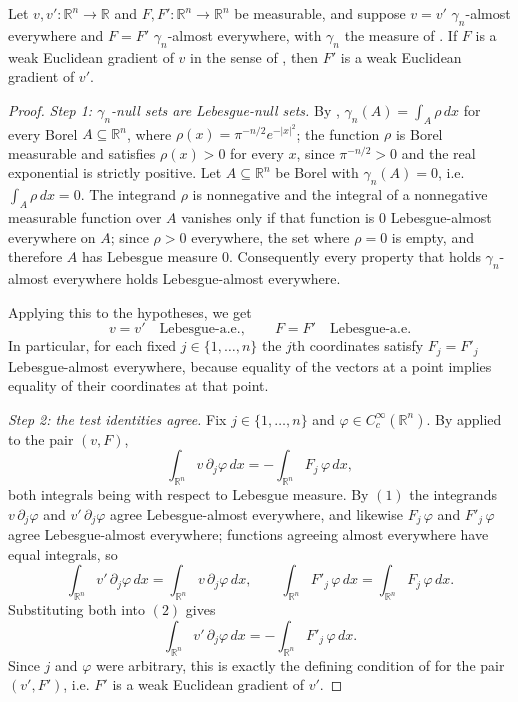 \begin{lemma}
Let $v, v' : \mathbb{R}^n \to \mathbb{R}$ and
$F, F' : \mathbb{R}^n \to \mathbb{R}^n$ be measurable, and suppose
$v = v'$ $\gamma_n$-almost everywhere and $F = F'$ $\gamma_n$-almost everywhere,
with $\gamma_n$ the measure of .  If $F$ is a weak
Euclidean gradient of $v$ in the sense of , then $F'$
is a weak Euclidean gradient of $v'$.
\end{lemma}
\begin{proof}
\emph{Step 1: $\gamma_n$-null sets are Lebesgue-null sets.}
By , $\gamma_n(A) = \int_A \rho\, dx$ for every Borel
$A \subseteq \mathbb{R}^n$, where $\rho(x) = \pi^{-n/2}e^{-|x|^2}$; the function
$\rho$ is Borel measurable and satisfies $\rho(x) > 0$ for every $x$, since
$\pi^{-n/2} > 0$ and the real exponential is strictly positive.  Let
$A \subseteq \mathbb{R}^n$ be Borel with $\gamma_n(A) = 0$, i.e.
$\int_A \rho\, dx = 0$.  The integrand $\rho$ is nonnegative and the integral of a
nonnegative measurable function over $A$ vanishes only if that function is $0$
Lebesgue-almost everywhere on $A$; since $\rho > 0$ everywhere, the set where
$\rho = 0$ is empty, and therefore $A$ has Lebesgue measure $0$.  Consequently
every property that holds $\gamma_n$-almost everywhere holds Lebesgue-almost
everywhere.

Applying this to the hypotheses, we get
\begin{equation*}
  v = v' \quad\text{Lebesgue-a.e.},
  \qquad
  F = F' \quad\text{Lebesgue-a.e.} \tag{1}
\end{equation*}
In particular, for each fixed $j \in \{1,\ldots,n\}$ the $j$th coordinates satisfy
$F_j = F'_j$ Lebesgue-almost everywhere, because equality of the vectors at a
point implies equality of their coordinates at that point.

\emph{Step 2: the test identities agree.}
Fix $j \in \{1,\ldots,n\}$ and $\varphi \in C_c^\infty(\mathbb{R}^n)$.  By
 applied to the pair $(v,F)$,
\begin{equation*}
  \int_{\mathbb{R}^n} v\, \partial_j\varphi \, dx
    = -\int_{\mathbb{R}^n} F_j\, \varphi \, dx , \tag{2}
\end{equation*}
both integrals being with respect to Lebesgue measure.  By $(1)$ the integrands
$v\,\partial_j\varphi$ and $v'\,\partial_j\varphi$ agree Lebesgue-almost
everywhere, and likewise $F_j\,\varphi$ and $F'_j\,\varphi$ agree
Lebesgue-almost everywhere; functions agreeing almost everywhere have equal
integrals, so
\[
  \int_{\mathbb{R}^n} v'\, \partial_j\varphi \, dx
    = \int_{\mathbb{R}^n} v\, \partial_j\varphi \, dx,
  \qquad
  \int_{\mathbb{R}^n} F'_j\, \varphi \, dx
    = \int_{\mathbb{R}^n} F_j\, \varphi \, dx .
\]
Substituting both into $(2)$ gives
\[
  \int_{\mathbb{R}^n} v'\, \partial_j\varphi \, dx
    = -\int_{\mathbb{R}^n} F'_j\, \varphi \, dx .
\]
Since $j$ and $\varphi$ were arbitrary, this is exactly the defining condition of
 for the pair $(v', F')$, i.e. $F'$ is a weak Euclidean
gradient of $v'$.
\end{proof}
